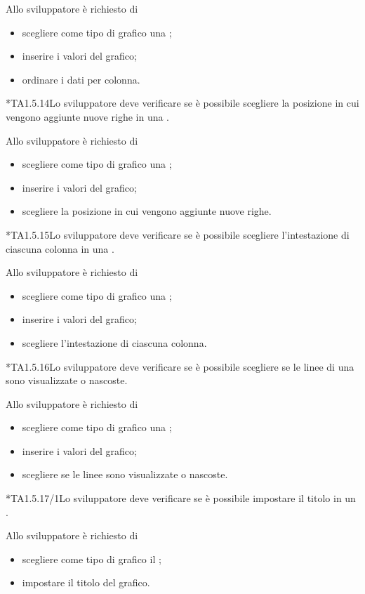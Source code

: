 		Allo sviluppatore è richiesto di
		\begin{itemize}
			\item scegliere come tipo di grafico una ;
			\item inserire i valori del grafico;
			\item ordinare i dati per colonna.
		\end{itemize}

	*{TA1.5.14}Lo sviluppatore deve verificare se è possibile scegliere la posizione in cui vengono aggiunte nuove righe in una .

		Allo sviluppatore è richiesto di
		\begin{itemize}
			\item scegliere come tipo di grafico una ;
			\item inserire i valori del grafico;
			\item scegliere la posizione in cui vengono aggiunte nuove righe.
		\end{itemize}

	*{TA1.5.15}Lo sviluppatore deve verificare se è possibile scegliere l'intestazione di ciascuna colonna in una .

		Allo sviluppatore è richiesto di
		\begin{itemize}
			\item scegliere come tipo di grafico una ;
			\item inserire i valori del grafico;
			\item scegliere l'intestazione di ciascuna colonna.
		\end{itemize}

	*{TA1.5.16}Lo sviluppatore deve verificare se è possibile scegliere se le linee di una  sono visualizzate o nascoste.

		Allo sviluppatore è richiesto di
		\begin{itemize}
			\item scegliere come tipo di grafico una ;
			\item inserire i valori del grafico;
			\item scegliere se le linee sono visualizzate o nascoste.
		\end{itemize}

	*{TA1.5.17/1}Lo sviluppatore deve verificare se è possibile impostare il titolo in un .

		Allo sviluppatore è richiesto di
		\begin{itemize}
			\item scegliere come tipo di grafico il ;
			\item impostare il titolo del grafico.
		\end{itemize}

